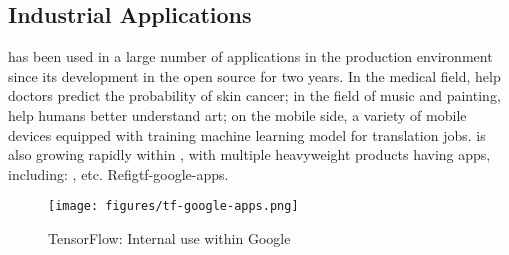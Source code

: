 \begin{content}
\subsection{Industrial Applications}
 has been used in a large number of applications in the production environment since its development in the open source for two years. In the medical field, help doctors predict the probability of skin cancer; in the field of music and painting, help humans better understand art; on the mobile side, a variety of mobile devices equipped with  training machine learning model for translation jobs.  is also growing rapidly within , with multiple heavyweight products having apps, including: , etc. Refig{tf-google-apps}.
\begin{figure}[!htbp]
  \centering
  \texttt{[image: figures/tf-google-apps.png]}
  \caption{TensorFlow: Internal use within Google}
  \label{fig:tf-google-apps}
\end{figure}

\end{content}
